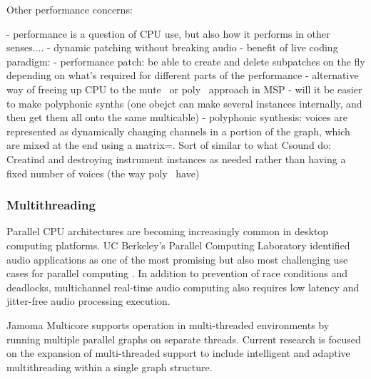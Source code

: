 \documentclass[twoside,a4paper]{article}
\begin{document}
 
Other performance concerns:

- performance is a question of CPU use, but also how it performs in other senses....
- dynamic patching without breaking audio
- benefit of live coding paradigm:
    - performance patch: be able to create and delete subpatches on the fly depending on what's required for different parts of the performance
    - alternative way of freeing up CPU to the mute~ or poly~ approach in MSP
    - will it be easier to make polyphonic synths (one obejct can make several instances internally, and then get them all onto the same multicable)
    - polyphonic synthesis: voices are represented as dynamically changing channels in a portion of the graph, which are mixed at the end using a matrix=. Sort of similar to what Csound do: Creatind and destroying instrument instances as needed rather than having a fixed number of voices (the way poly~ have)

%


\subsubsection{Multithreading} %

Parallel CPU architectures are becoming increasingly common in desktop computing platforms.
UC Berkeley's Parallel Computing Laboratory identified audio applications as one of the most promising but also most challenging use cases for parallel computing \cite{asanovic2008parallel}. 
In addition to prevention of race conditions and deadlocks, multichannel real-time audio computing also requires low latency and jitter-free audio processing execution.

Jamoma Multicore supports operation in multi-threaded environments by running multiple parallel graphs on separate threads.  Current research is focused on the expansion of multi-threaded support to include intelligent and adaptive multithreading within a single graph structure.  
\end{document}
